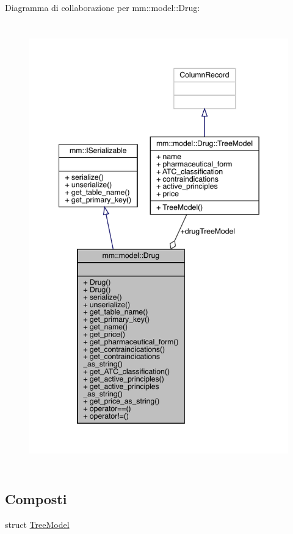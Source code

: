 Diagramma di collaborazione per mm\+:\+:model\+:\+:Drug\+:
\nopagebreak
\begin{figure}[H]
\begin{center}
\leavevmode
\includegraphics[height=550pt]{d7/d98/classmm_1_1model_1_1_drug__coll__graph}
\end{center}
\end{figure}
\subsection*{Composti}
\begin{DoxyCompactItemize}
\item 
struct \mbox{\hyperlink{structmm_1_1model_1_1_drug_1_1_tree_model}{Tree\+Model}}
\end{DoxyCompactItemize}
